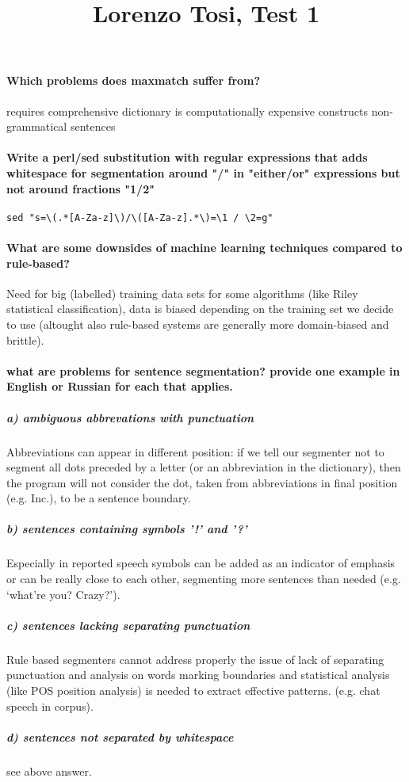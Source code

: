 \documentclass{report}
\title{Lorenzo Tosi, Test 1}
\begin{document}
\maketitle
\paragraph{Which problems does maxmatch suffer from?}
requires comprehensive dictionary
is computationally expensive
constructs non-grammatical sentences
\paragraph{Write a perl/sed substitution with regular expressions that adds whitespace for segmentation around "/" in "either/or" expressions but not around fractions "1/2"}
\begin{verbatim}
sed "s=\(.*[A-Za-z]\)/\([A-Za-z].*\)=\1 / \2=g"
\end{verbatim} 
\paragraph{What are some downsides of machine learning techniques compared to rule-based?}
Need for big (labelled) training data sets for some algorithms (like Riley statistical classification), data is biased depending on the training set we decide to use (altought also rule-based systems are generally more domain-biased and brittle).
\paragraph{what are problems for sentence segmentation? provide one example in English or Russian for each that applies.}
\subparagraph{a) ambiguous abbrevations with punctuation} 
Abbreviations can appear in different position: if we tell our segmenter not to segment all dots preceded by a letter (or an abbreviation in the dictionary), then the program will not consider the dot, taken from abbreviations in final position (e.g. Inc.), to be a sentence boundary.
\subparagraph{b) sentences containing symbols '!' and '?'}
Especially in reported speech symbols can be added as an indicator of emphasis or can be really close to each other, segmenting more sentences than needed (e.g. ‘what’re you? Crazy?’).
\subparagraph{c) sentences lacking separating punctuation}
Rule based segmenters cannot address properly the issue of lack of separating punctuation and analysis on words marking boundaries and statistical analysis (like POS position analysis) is needed to extract effective patterns. (e.g. chat speech in corpus).
\subparagraph{d) sentences not separated by whitespace}
see above answer.
\end{document}
